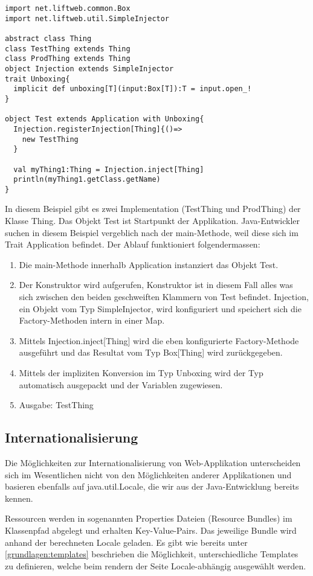 \begin{lstlisting}[caption=Dependency Injection mit dem Lift Framework - ein Beispiel]
import net.liftweb.common.Box
import net.liftweb.util.SimpleInjector

abstract class Thing
class TestThing extends Thing
class ProdThing extends Thing
object Injection extends SimpleInjector
trait Unboxing{
  implicit def unboxing[T](input:Box[T]):T = input.open_!
}

object Test extends Application with Unboxing{
  Injection.registerInjection[Thing]{()=>
    new TestThing
  }

  val myThing1:Thing = Injection.inject[Thing]
  println(myThing1.getClass.getName)
}\end{lstlisting}
In diesem Beispiel gibt es zwei Implementation (TestThing und ProdThing) der Klasse Thing. Das Objekt Test ist Startpunkt der Applikation. Java-Entwickler suchen in diesem Beispiel vergeblich nach der main-Methode, weil diese sich im Trait Application befindet. Der Ablauf  funktioniert folgendermassen:
\begin{enumerate}
\item Die main-Methode innerhalb Application instanziert das Objekt Test.
\item Der Konstruktor wird aufgerufen, Konstruktor ist in diesem Fall alles was sich zwischen den beiden geschweiften Klammern von Test befindet. Injection, ein Objekt vom Typ SimpleInjector, wird konfiguriert und speichert sich die Factory-Methoden intern in einer Map.
\item Mittels Injection.inject[Thing] wird die eben konfigurierte Factory-Methode ausgef\"uhrt und das Resultat vom Typ Box[Thing] wird zur\"uckgegeben.
\item Mittels der impliziten Konversion im Typ Unboxing wird der Typ automatisch ausgepackt und der Variablen zugewiesen.
\item Ausgabe: TestThing
\end{enumerate}

\subsection{Internationalisierung}\label{lift:internationalisierung}
Die M\"oglichkeiten zur Internationalisierung von Web-Applikation unterscheiden sich im Wesentlichen nicht von den M\"oglichkeiten anderer Applikationen und basieren ebenfalls auf java.util.Locale, die wir aus der Java-Entwicklung bereits kennen. 

Ressourcen werden in sogenannten Properties Dateien (Resource Bundles) im Klassenpfad abgelegt und erhalten Key-Value-Pairs. Das jeweilige Bundle wird anhand der berechneten Locale geladen. 
Es gibt wie bereits unter \ref{grundlagen:templates}  beschrieben die M\"oglichkeit, unterschiedliche Templates zu definieren, welche beim rendern der Seite Locale-abh\"angig ausgew\"ahlt werden.

